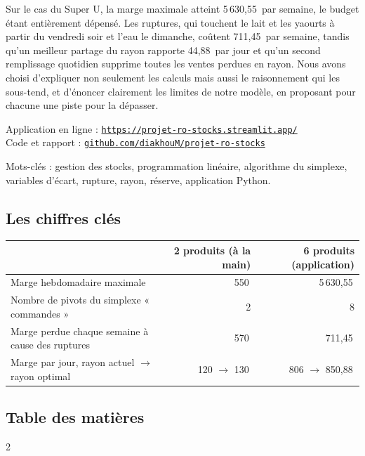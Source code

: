 \documentclass[11pt,a4paper]{article}
\newcommand{\eur}{\,\text{€}}
\begin{document}
Sur le cas du Super U, la marge maximale atteint 5\,630,55\eur{} par semaine, le budget étant
entièrement dépensé. Les ruptures, qui touchent le lait et les yaourts à partir du vendredi
soir et l'eau le dimanche, coûtent 711,45\eur{} par semaine, tandis qu'un meilleur partage du
rayon rapporte 44,88\eur{} par jour et qu'un second remplissage quotidien supprime toutes les
ventes perdues en rayon. Nous avons choisi d'expliquer non seulement les calculs mais aussi
le raisonnement qui les sous-tend, et d'énoncer clairement les limites de notre modèle, en
proposant pour chacune une piste pour la dépasser.

Application en ligne : \href{https://projet-ro-stocks.streamlit.app/}{\texttt{https://projet-ro-stocks.streamlit.app/}}\\
Code et rapport : \href{https://github.com/diakhouM/projet-ro-stocks}{\texttt{github.com/diakhouM/projet-ro-stocks}}

Mots-clés : gestion des stocks, programmation linéaire, algorithme du simplexe,
variables d'écart, rupture, rayon, réserve, application Python.

\subsection*{Les chiffres clés}
\begin{center}\small
\begin{tabular}{@{}lrr@{}}
\toprule
 & 2 produits (à la main) & 6 produits (application) \\
\midrule
Marge hebdomadaire maximale & 550\eur & 5\,630,55\eur \\
Nombre de pivots du simplexe « commandes » & 2 & 8 \\
Marge perdue chaque semaine à cause des ruptures & 570\eur & 711,45\eur \\
Marge par jour, rayon actuel $\to$ rayon optimal & 120 $\to$ 130\eur & 806 $\to$ 850,88\eur \\
\bottomrule
\end{tabular}
\end{center}

\begingroup\makeatletter\setlength{\parskip}{0pt}\footnotesize
\subsection*{Table des matières}
\begin{multicols}{2}\end{multicols}
\endgroup
\newpage
\end{document}
